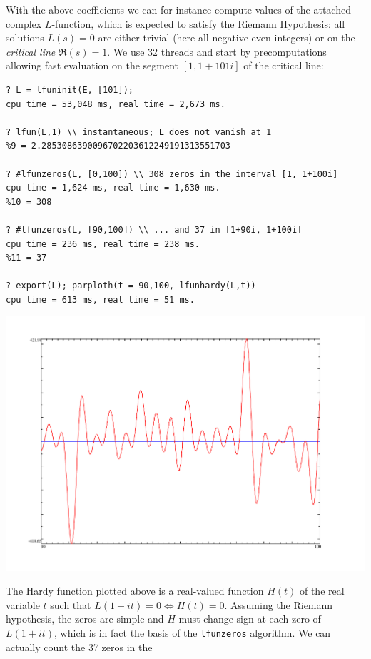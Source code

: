 \documentclass{deliverablereport}
\begin{document}
With the above coefficients we can for instance compute values of the attached
complex $L$-function, which is expected to satisfy the Riemann Hypothesis: all
solutions $L(s) = 0$ are either trivial (here all negative even integers)
or on the \emph{critical line} $\Re(s) = 1$. We use 32 threads and
start by precomputations allowing fast evaluation on the segment
$[1, 1 + 101i]$ of the critical line:
\begin{verbatim}
? L = lfuninit(E, [101]);
cpu time = 53,048 ms, real time = 2,673 ms.

? lfun(L,1) \\ instantaneous; L does not vanish at 1
%9 = 2.2853086390096702203612249191313551703

? #lfunzeros(L, [0,100]) \\ 308 zeros in the interval [1, 1+100i]
cpu time = 1,624 ms, real time = 1,630 ms.
%10 = 308

? #lfunzeros(L, [90,100]) \\ ... and 37 in [1+90i, 1+100i]
cpu time = 236 ms, real time = 238 ms.
%11 = 37

? export(L); parploth(t = 90,100, lfunhardy(L,t))
cpu time = 613 ms, real time = 51 ms.
\end{verbatim}
\begin{center}
\includegraphics[scale=0.45]{L.pdf}
\end{center}
The Hardy function plotted above is a real-valued function $H(t)$ of the real
variable $t$ such that $L(1+it) = 0 \Leftrightarrow H(t) = 0$. Assuming
the Riemann hypothesis, the zeros are simple and $H$ must change sign
at each zero of $L(1+it)$, which is in fact the basis of the
\texttt{lfunzeros} algorithm. We can actually count the 37 zeros in the
\end{document}
